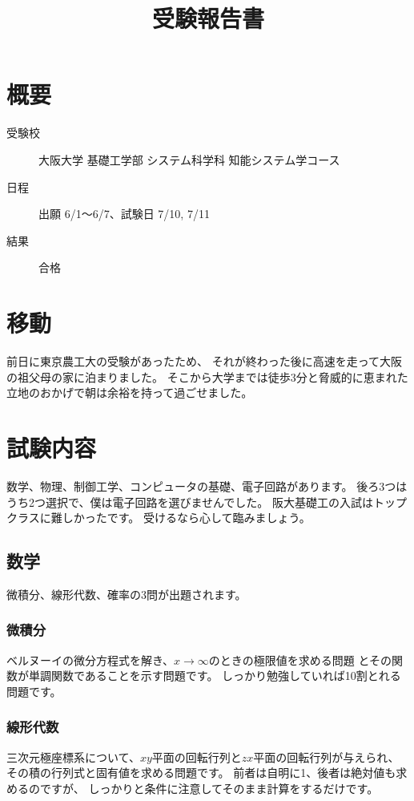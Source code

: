 \documentclass[]{jsarticle}
\title{受験報告書}
\date{}
\begin{document}
\maketitle
\section*{概要}
    \begin{description}
        \item[受験校] 大阪大学 基礎工学部 システム科学科 知能システム学コース
        \item[日程] 出願 6/1〜6/7、試験日 7/10, 7/11
        \item[結果] 合格
    \end{description}
\section*{移動}
    前日に東京農工大の受験があったため、
    それが終わった後に高速を走って大阪の祖父母の家に泊まりました。
    そこから大学までは徒歩3分と脅威的に恵まれた立地のおかげで朝は余裕を持って過ごせました。
\section*{試験内容}
    数学、物理、制御工学、コンピュータの基礎、電子回路があります。
    後ろ3つはうち2つ選択で、僕は電子回路を選びませんでした。
    阪大基礎工の入試はトップクラスに難しかったです。
    受けるなら心して臨みましょう。
    \subsection*{数学}
        微積分、線形代数、確率の3問が出題されます。
        \subsubsection*{微積分}
            ベルヌーイの微分方程式を解き、$x\rightarrow \infty$のときの極限値を求める問題
            とその関数が単調関数であることを示す問題です。
            しっかり勉強していれば10割とれる問題です。
        \subsubsection*{線形代数}
            三次元極座標系について、$xy$平面の回転行列と$zx$平面の回転行列が与えられ、
            その積の行列式と固有値を求める問題です。
            前者は自明に1、後者は絶対値も求めるのですが、
            しっかりと条件に注意してそのまま計算をするだけです。
\end{document}
